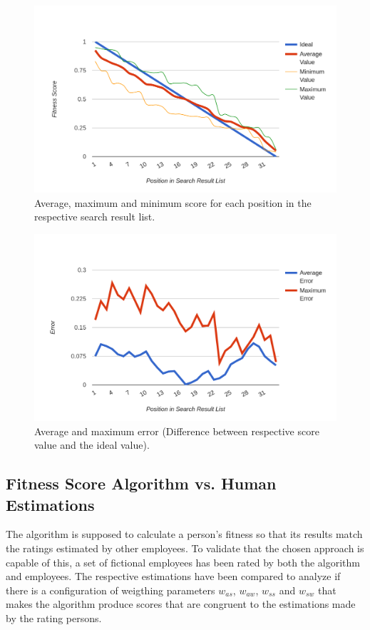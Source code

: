 \begin{figure}[H]
    \centering
    \includegraphics[width=\textwidth]{images/dist_avg.png}
    \caption[Diagram: Fitness Score Distribution (Processed)]{Average, maximum and minimum score for each position in the respective search result list.}
    \label{fig:dist-avg}
\end{figure}

\begin{figure}[H]
    \centering
    \includegraphics[width=\textwidth]{images/dist_error.png}
    \caption[Diagram: Fitness Score Distribution (Error Rates)]{Average and maximum error (Difference between respective score value and the ideal value).}
    \label{fig:dist-err}
\end{figure}

\newpage

\subsection{Fitness Score Algorithm vs. Human Estimations}
The algorithm is supposed to calculate a person's fitness so that its results match the ratings estimated by other employees. To validate that
the chosen approach is capable of this, a set of fictional employees has been rated by both the algorithm and employees. The respective estimations have been compared to analyze if there is a configuration of weigthing parameters $w_{as}$, $w_{aw}$, $w_{ss}$ and $w_{sw}$ that makes the algorithm produce scores that are
congruent to the estimations made by the rating persons.

